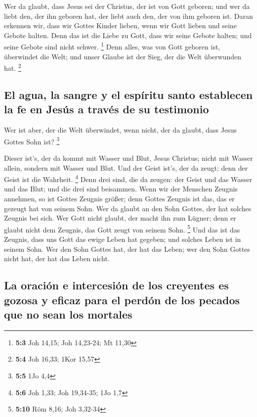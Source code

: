  Wer da glaubt, dass Jesus sei der Christus, der ist von
Gott geboren; und wer da liebt den, der ihn geboren hat, der liebt auch
den, der von ihm geboren ist.  Daran erkennen wir, dass
wir Gottes Kinder lieben, wenn wir Gott lieben und seine Gebote halten.
 Denn das ist die Liebe zu Gott, dass wir seine Gebote
halten; und seine Gebote sind nicht schwer. \footnote{\textbf{5:3} Joh
  14,15; Joh 14,23-24; Mt 11,30}  Denn alles, was von Gott
geboren ist, überwindet die Welt; und unser Glaube ist der Sieg, der die
Welt überwunden hat. \footnote{\textbf{5:4} Joh 16,33; 1Kor 15,57}

\hypertarget{el-agua-la-sangre-y-el-espuxedritu-santo-establecen-la-fe-en-jesuxfas-a-travuxe9s-de-su-testimonio}{%
\subsection{El agua, la sangre y el espíritu santo establecen la fe en
Jesús a través de su
testimonio}\label{el-agua-la-sangre-y-el-espuxedritu-santo-establecen-la-fe-en-jesuxfas-a-travuxe9s-de-su-testimonio}}

 Wer ist aber, der die Welt überwindet, wenn nicht, der da
glaubt, dass Jesus Gottes Sohn ist? \footnote{\textbf{5:5} 1Jo 4,4}

 Dieser ist's, der da kommt mit Wasser und Blut, Jesus
Christus; nicht mit Wasser allein, sondern mit Wasser und Blut. Und der
Geist ist's, der da zeugt; denn der Geist ist die Wahrheit. \footnote{\textbf{5:6}
  Joh 1,33; Joh 19,34-35; 1Jo 1,7}  Denn drei sind, die da
zeugen: der Geist und das Wasser und das Blut;  und die
drei sind beisammen.  Wenn wir der Menschen Zeugnis
annehmen, so ist Gottes Zeugnis größer; denn Gottes Zeugnis ist das, das
er gezeugt hat von seinem Sohn.  Wer da glaubt an den
Sohn Gottes, der hat solches Zeugnis bei sich. Wer Gott nicht glaubt,
der macht ihn zum Lügner; denn er glaubt nicht dem Zeugnis, das Gott
zeugt von seinem Sohn. \footnote{\textbf{5:10} Röm 8,16; Joh 3,32-34}
 Und das ist das Zeugnis, dass uns Gott das ewige Leben
hat gegeben; und solches Leben ist in seinem Sohn.  Wer
den Sohn Gottes hat, der hat das Leben; wer den Sohn Gottes nicht hat,
der hat das Leben nicht.

\hypertarget{la-oraciuxf3n-e-intercesiuxf3n-de-los-creyentes-es-gozosa-y-eficaz-para-el-perduxf3n-de-los-pecados-que-no-sean-los-mortales}{%
\subsection{La oración e intercesión de los creyentes es gozosa y eficaz
para el perdón de los pecados que no sean los
mortales}\label{la-oraciuxf3n-e-intercesiuxf3n-de-los-creyentes-es-gozosa-y-eficaz-para-el-perduxf3n-de-los-pecados-que-no-sean-los-mortales}}

